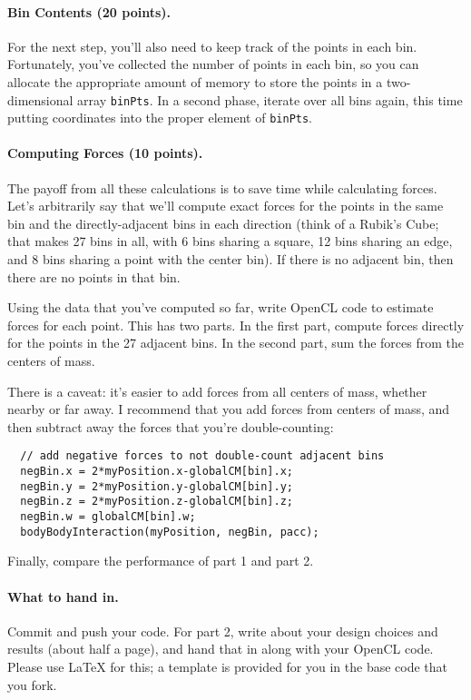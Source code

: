 \documentclass[letterpaper,10pt]{article}
\begin{document}
\paragraph{Bin Contents (20 points).}
For the next step, you'll also need to keep track of the points in
each bin. Fortunately, you've collected the number of points in each
bin, so you can allocate the appropriate amount of memory to store the
points in a two-dimensional array {\tt binPts}. In a second phase,
iterate over all bins again, this time putting coordinates into the
proper element of {\tt binPts}.

\paragraph{Computing Forces (10 points).}
The payoff from all these calculations is to save time while
calculating forces. Let's arbitrarily say that we'll compute exact
forces for the points in the same bin and the directly-adjacent bins
in each direction (think of a Rubik's Cube; that makes 27 bins in all,
with 6 bins sharing a square, 12 bins sharing an edge, and 8 bins
sharing a point with the center bin). If there is no adjacent bin,
then there are no points in that bin. 

Using the data that you've
computed so far, write OpenCL code to estimate forces for each point.
This has two parts. In the first part, compute forces directly for the 
points in the 27 adjacent bins. In the second part, 
sum the forces from the centers of mass. 

There is a caveat: it's easier to add forces from all centers of mass,
whether nearby or far away. I recommend that you add forces from centers
of mass, and then subtract away the forces that you're double-counting:

\begin{verbatim}
  // add negative forces to not double-count adjacent bins
  negBin.x = 2*myPosition.x-globalCM[bin].x;
  negBin.y = 2*myPosition.y-globalCM[bin].y;
  negBin.z = 2*myPosition.z-globalCM[bin].z;
  negBin.w = globalCM[bin].w;
  bodyBodyInteraction(myPosition, negBin, pacc);
\end{verbatim}

Finally, compare the performance of part 1 and part 2.

\paragraph{What to hand in.} Commit and push your code.
For part 2,
write about your design choices and results (about half a page), and
hand that in along with your OpenCL code. Please use LaTeX for this; a template is provided for you in the base code that you fork. 
\end{document}
